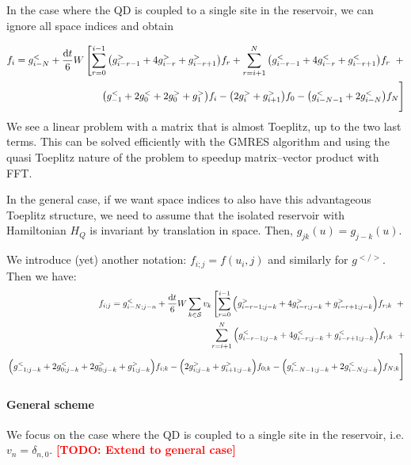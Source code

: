 \documentclass[12pt]{article}
\newcommand\TODO[1]{\textcolor{red}{\textbf{[TODO: #1]}}}
\begin{document}
In the case where the \ac{QD} is coupled to a single site in the reservoir, we can ignore all space indices and obtain

\begin{equation}
	\begin{split}
	f_i = g_{i - N}^< + \frac{\dd{t}}{6} W \left[
	 \sum_{r=0}^{i-1} \qty(g^>_{i-r-1} + 4 g^>_{i - r} + g^>_{i-r + 1}) f_{r} +
	 \sum_{r=i+1}^{N} \qty(g^<_{i-r-1} + 4 g^<_{i - r} + g^<_{i-r+1}) f_{r} \;\; + \right.
	 \\
	 \left. \qty(g^<_{-1} + 2 g^<_{0} + 2 g^>_{0} + g^>_{1}) f_{i}
	 - \qty(2 g^>_{i} + g^>_{i + 1}) f_{0}
	 - \qty(g^<_{i-N-1} + 2 g^<_{i-N}) f_N
	 \vphantom{\sum_{i=0}^N}\right]
	 \end{split}
\end{equation}
We see a linear problem with a matrix that is almost Toeplitz, up to the two last terms. This can be solved efficiently with the GMRES algorithm and using the quasi Toeplitz nature of the problem to speedup matrix--vector product with FFT.

In the general case, if we want space indices to also have this advantageous Toeplitz structure, we need to assume that the isolated reservoir with Hamiltonian $H_Q$ is invariant by translation in space.
Then, $g_{jk}(u) = g_{j - k}(u)$.

We introduce (yet) another notation: $f_{i; j} = f(u_i, j)$ and similarly for $g^{</>}$.
Then we have:
\begin{equation}
	\begin{split}
		f_{i;j} = g_{i - N;j-n}^< + \frac{\dd{t}}{6} W \sum_{k \in \mathcal{S}} v_k \left[
		\sum_{r=0}^{i-1} \qty(g^>_{i-r-1; j-k} + 4 g^>_{i - r; j-k} + g^>_{i-r + 1; j-k}) f_{r;k} \;\; + \right.
		\\
		\sum_{r=i+1}^{N} \qty(g^<_{i-r-1;j-k} + 4 g^<_{i - r;j-k} + g^<_{i-r+1;j-k}) f_{r;k} \;\; +
		\\
		\left. \qty(g^<_{-1;j-k} + 2 g^<_{0;j-k} + 2 g^>_{0;j-k} + g^>_{1;j-k}) f_{i;k}
		- \qty(2 g^>_{i;j-k} + g^>_{i + 1;j-k}) f_{0;k}
		- \qty(g^<_{i-N-1;j-k} + 2 g^<_{i-N;j-k}) f_{N;k}
		\vphantom{\sum_{i=0}^N}\right]
	\end{split}
\end{equation}

\paragraph{General scheme}

We focus on the case where the \ac{QD} is coupled to a single site in the reservoir, i.e. $v_n = \delta_{n,0}$.
\TODO{Extend to general case}
\end{document}
